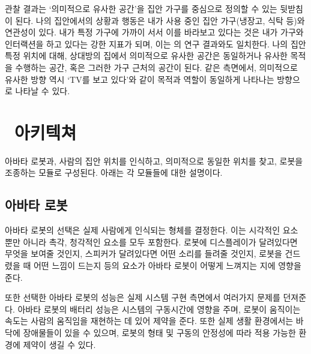 관찰 결과는 `의미적으로 유사한 공간'을 집안 가구를 중심으로 정의할 수 있는 뒷받침이 된다. 나의 집안에서의 상황과 행동은 내가 사용 중인 집안 가구(냉장고, 식탁 등)와 연관성이 있다. 내가 특정 가구에 가까이 서서 이를 바라보고 있다는 것은 내가 가구와 인터랙션을 하고 있다는 강한 지표가 되며, 이는 \cite{philipose2004inferring}의 연구 결과와도 일치한다. 나의 집안 특정 위치에 대해, 상대방의 집에서 의미적으로 유사한 공간은 동일하거나 유사한 목적을 수행하는 공간, 혹은 그러한 가구 근처의 공간이 된다. 같은 측면에서, 의미적으로 유사한 방향 역시 `TV를 보고 있다'와 같이 목적과 역할이 동일하게 나타나는 방향으로 나타날 수 있다.


\section{\sysname\ 아키텍쳐}


\sysname\은 아바타 로봇과, 사람의 집안 위치를 인식하고, 의미적으로 동일한 위치를 찾고, 로봇을 조종하는 모듈로 구성된다.  아래는 각 모듈들에 대한 설명이다.


\subsection{아바타 로봇}
아바타 로봇의 선택은 실제 사람에게 인식되는 형체를 결정한다. 이는 시각적인 요소 뿐만 아니라 촉각, 청각적인 요소를 모두 포함한다. 로봇에 디스플레이가 달려있다면 무엇을 보여줄 것인지, 스피커가 달려있다면 어떤 소리를 들려줄 것인지, 로봇을 건드렸을 때 어떤 느낌이 드는지 등의 요소가 아바타 로봇이 어떻게 느껴지는 지에 영향을 준다.

또한 선택한 아바타 로봇의 성능은 실제 시스템 구현 측면에서 여러가지 문제를 던져준다. 아바타 로봇의 배터리 성능은 시스템의 구동시간에 영향을 주며, 로봇이 움직이는 속도는 사람의 움직임을 재현하는 데 있어 제약을 준다. 또한 실제 생활 환경에서는 바닥에 장애물들이 있을 수 있으며, 로봇의 형태 및 구동의 안정성에 따라 적용 가능한 환경에 제약이 생길 수 있다.

